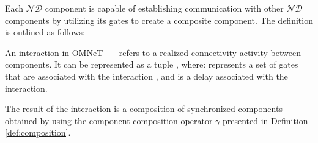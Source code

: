 Each \(\mathcal{ND}\) component is capable of establishing communication with other \(\mathcal{ND}\) components by utilizing its gates to create a composite component. The definition is outlined as follows:


 






\begin{mydef}[Interaction] \label{inter} An interaction in OMNeT++ refers to a realized connectivity activity between components. It can be represented as a tuple  , where:   represents a set of gates that are associated with the interaction , and  is a delay associated with the interaction.
\end{mydef}




The result of the interaction is a composition of synchronized components obtained by using the component composition operator  $\gamma$  presented in Definition \ref{def:composition}.


